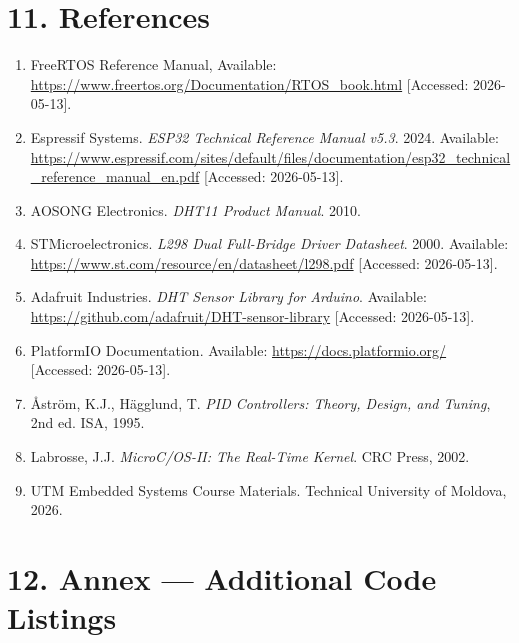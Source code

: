 \documentclass[12pt]{article}
\begin{document}
\section*{11. References}

\begin{enumerate}
    \item FreeRTOS Reference Manual, Available: \url{https://www.freertos.org/Documentation/RTOS_book.html}
          [Accessed: 2026-05-13].

    \item Espressif Systems. \textit{ESP32 Technical Reference Manual v5.3}. 2024.
          Available: \url{https://www.espressif.com/sites/default/files/documentation/esp32_technical_reference_manual_en.pdf}
          [Accessed: 2026-05-13].

    \item AOSONG Electronics. \textit{DHT11 Product Manual}. 2010.

    \item STMicroelectronics. \textit{L298 Dual Full-Bridge Driver Datasheet}. 2000.
          Available: \url{https://www.st.com/resource/en/datasheet/l298.pdf}
          [Accessed: 2026-05-13].

    \item Adafruit Industries. \textit{DHT Sensor Library for Arduino}.
          Available: \url{https://github.com/adafruit/DHT-sensor-library} [Accessed: 2026-05-13].

    \item PlatformIO Documentation. Available: \url{https://docs.platformio.org/} [Accessed: 2026-05-13].

    \item \r{A}str\"{o}m, K.J., H\"{a}gglund, T. \textit{PID Controllers: Theory, Design, and
          Tuning}, 2nd ed. ISA, 1995.

    \item Labrosse, J.J. \textit{MicroC/OS-II: The Real-Time Kernel}. CRC Press, 2002.

    \item UTM Embedded Systems Course Materials. Technical University of Moldova, 2026.
\end{enumerate}

\section*{12. Annex --- Additional Code Listings}
\end{document}
